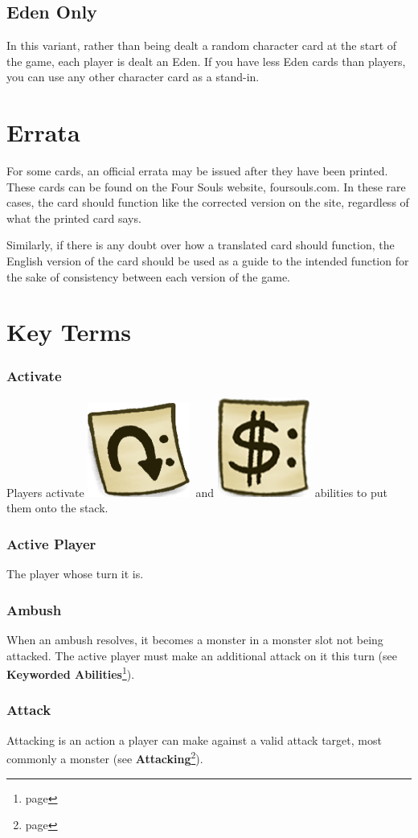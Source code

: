 \documentclass[a4paper, twoside]{report} %
\newcommand{\tap}{\includegraphics[scale=0.1]{./assets/Tag_Tap.png}}
\newcommand{\pay}{\includegraphics[scale=0.1]{./assets/Tag_Paid.png}}
\begin{document}
    \section{Eden Only}
    In this variant, rather than being dealt a random character card at the start of the game, each player is dealt an Eden. If you have less Eden cards than players, you can use any other character card as a stand-in.
    \chapter{Errata}
    For some cards, an official errata may be issued after they have been printed. These cards can be found on the Four Souls website, foursouls.com. In these rare cases, the card should function like the corrected version on the site, regardless of what the printed card says.
    
    Similarly, if there is any doubt over how a translated card should function, the English version of the card should be used as a guide to the intended function for the sake of consistency between each version of the game.

    \chapter{Key Terms}
    \subsection*{Activate}
    Players activate \tap\ and \pay\ abilities to put them onto the stack.
    \subsection*{Active Player}
    The player whose turn it is.
    \subsection*{Ambush}
    When an ambush resolves, it becomes a monster in a monster slot not being attacked. The active player must make an additional attack on it this turn (see \textbf{Keyworded Abilities}\footnote{page \pageref{keyworded}}).
    \subsection*{Attack}
    Attacking is an action a player can make against a valid attack target, most commonly a monster (see \textbf{Attacking}\footnote{page \pageref{attacking}}).
\end{document}
